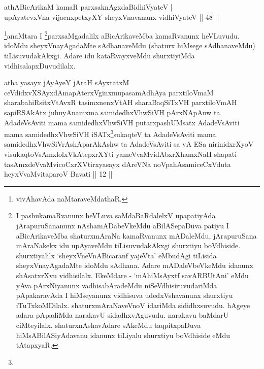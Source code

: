 
\begin{shl}
athA\s \s BicArikaM kamaR parxsaknAgxdaBidhiVyateV | \\
upAyatevxVna vijacnxpetxyXY sheyxVnavananx vidhiVyateV \hfill|| 48 || 
\end{shl}

\begin{artha}
\footnote[1]{vivAhavAda naMtaraveMdathaR.}anaMtara I \footnote[2]{I 
pashukamaRvanunx heVLuva saMdaBaRdalelxV upapatiyAda jArapuruSananunx 
nAshamADa\-beVkeMdu aBilASepaDuva patiyu I aBicArikaveMba shaturxmAraNa 
kamaRvanunx mADaleMdu, jArapuruSana mAraNakekx idu upAyaveMdu 
tiLisuvudakAkxgi shurxtiyu boVdhiside. shurxtiyalilx 
`sheyxVneVnABicaranf yajeVta' eMbudAgi tiLisida sheyxVnayAgadaMte 
idoMdu sAdhana. Adare mADaleVbeVkeMdu idanunx shAsatxrXvu vidhisilalx. 
EkeMdare - `mAhiMsAyxtf savARBUtAni' eMdu yAva pArxNiyanunx 
vadhisabAradeMdu niSeVdhisiruvudariMda pApakaravAda I hiMseyanunx 
vidhisuva udedxVshavanunx shurxtiyu iTuTxkoMDilalx. 
shaturxmAraNaveVnoV idariMda sididhxsuvudu. hAgeye adara pApadiMda 
narakavU sidadhxvAguvudu. narakavu baMdarU ciMteyilalx. 
shaturxnAshavAdare sAkeMdu taqpitxpaDuva hiMsABilASiyAdavanu idanunx 
tiLiyalu shurxtiyu boVdhiside eMdu tAtapxyaR.}parxsaMgadalilx aBicArikaveMba 
kamaRvanunx heVLuvudu. idoMdu sheyxVnayAgadaMte sAdhanaveMdu (shaturx 
hiMsege sAdhanaveMdu) tiLisuvudakAkxgi. Adare idu kataRvayxveMdu 
shurxtiyiMda vidhisalapxDuvudilalx.
\end{artha}


\begin{shl}
atha yasayx jAyAyeY jAraH sAyxtatxM ceVdidxvXSAyxdAmapAterxV\s ginxmupasamAdhAya parxtiloVmaM sharabahiRsitxVtAvxR tasimxnenxVtAH sharaBaqSiTxVH parxtiloVmAH sapiRSAkAtx juhuyAnamxma samidedhxV\s hwSiVH pArxNApAnw ta AdadeV\s sAviti mama samidedhxV\s hwSiVH putarxpashUMsatx AdadeV\s sAviti mama samidedhxV\s hwSiVH \footnotemark[1]{}iSATx\footnote[2]{}sukaqteV ta AdadeV\s sAviti mama samidedhxV\s hwSiV\footnotemark[3]{}rAshA\footnotemark[4]{}parAkAshw ta AdadeV\s sAviti sa vA ESa nirinidxrXyoV visukaqtoV\s sAmxlolxVkAtepxrXYti yameVvaMvidAbxrXhamxNaH shapati tasAmxdeVvaMvicoCxrXVtirxyasayx dAreVNa noVpahAsamiceCxVduta heyxVvaMvitaparoV Bavati || 12 ||
\end{shl}

